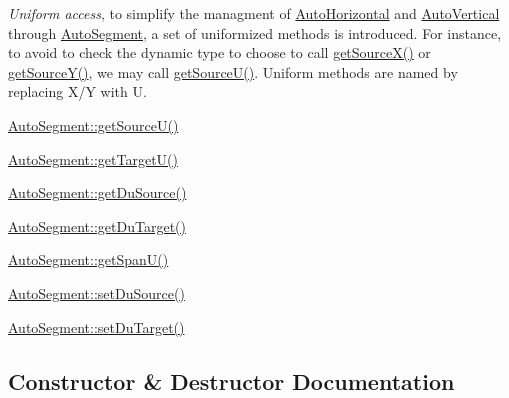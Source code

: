 \begin{DoxyItemize}
\item {\itshape Uniform access}, to simplify the managment of \mbox{\hyperlink{classKatabatic_1_1AutoHorizontal}{Auto\+Horizontal}} and \mbox{\hyperlink{classKatabatic_1_1AutoVertical}{Auto\+Vertical}} through \mbox{\hyperlink{classKatabatic_1_1AutoSegment}{Auto\+Segment}}, a set of uniformized methods is introduced. For instance, to avoid to check the dynamic type to choose to call \mbox{\hyperlink{classKatabatic_1_1AutoSegment_a8a8e127557d70de70f9efb488be30d1a}{get\+Source\+X()}} or \mbox{\hyperlink{classKatabatic_1_1AutoSegment_ae913463a76d08b079611a993cebea1a9}{get\+Source\+Y()}}, we may call \mbox{\hyperlink{classKatabatic_1_1AutoSegment_aeaa1543880686755e389c4807128428f}{get\+Source\+U()}}. Uniform methods are named by replacing {\ttfamily X/Y} with {\ttfamily U}. 
\begin{DoxyItemize}
\item \mbox{\hyperlink{classKatabatic_1_1AutoSegment_aeaa1543880686755e389c4807128428f}{Auto\+Segment\+::get\+Source\+U()}} 
\item \mbox{\hyperlink{classKatabatic_1_1AutoSegment_a828fef2716cc9c370d6d170bb96556ec}{Auto\+Segment\+::get\+Target\+U()}} 
\item \mbox{\hyperlink{classKatabatic_1_1AutoSegment_ab4881df67bd8f036d0199ed6540fe774}{Auto\+Segment\+::get\+Du\+Source()}} 
\item \mbox{\hyperlink{classKatabatic_1_1AutoSegment_a0644d656eedc71dba2fb3c6c0d83ed3f}{Auto\+Segment\+::get\+Du\+Target()}} 
\item \mbox{\hyperlink{classKatabatic_1_1AutoSegment_a248eb2fbb06e3286650b28567d495f0b}{Auto\+Segment\+::get\+Span\+U()}} 
\item \mbox{\hyperlink{classKatabatic_1_1AutoSegment_aaf60d18ab6d951a34a3d06959ce2e76f}{Auto\+Segment\+::set\+Du\+Source()}} 
\item \mbox{\hyperlink{classKatabatic_1_1AutoSegment_a246756d4c8b3e094a0a9d6de3c2109ff}{Auto\+Segment\+::set\+Du\+Target()}} 
\end{DoxyItemize}
\end{DoxyItemize}

\subsection{Constructor \& Destructor Documentation}
\mbox{\label{classKatabatic_1_1AutoSegment_ae64a61508d148cb4a0ee9b5ffb177659}} 
